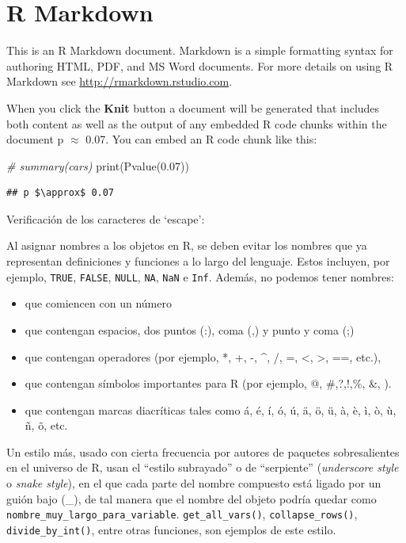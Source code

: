 \documentclass[
  11pt,
  twoside]{book}
\newenvironment{Shaded}{\begin{snugshade}}{\end{snugshade}}
\newcommand{\CommentTok}[1]{\textcolor[rgb]{0.56,0.35,0.01}{\textit{#1}}}
\newcommand{\FloatTok}[1]{\textcolor[rgb]{0.00,0.00,0.81}{#1}}
\newcommand{\FunctionTok}[1]{\textcolor[rgb]{0.00,0.00,0.00}{#1}}
\newcommand{\NormalTok}[1]{#1}
\providecommand{\tightlist}{%
  \setlength{\itemsep}{0pt}\setlength{\parskip}{0pt}}
\theoremstyle{definition}
\theoremstyle{definition}
\theoremstyle{definition}
\theoremstyle{definition}
\theoremstyle{remark}
\begin{document}
\hypertarget{r-markdown}{%
\section{R Markdown}\label{r-markdown}}

This is an R Markdown document. Markdown is a simple formatting syntax for authoring HTML, PDF, and MS Word documents. For more details on using R Markdown see \url{http://rmarkdown.rstudio.com}.

When you click the \textbf{Knit} button a document will be generated that includes both content as well as the output of any embedded R code chunks within the document p \(\approx\) 0.07. You can embed an R code chunk like this:

\begin{Shaded}
\begin{Highlighting}[]
\CommentTok{\# summary(cars)}
\FunctionTok{print}\NormalTok{(}\FunctionTok{Pvalue}\NormalTok{(}\FloatTok{0.07}\NormalTok{))}
\end{Highlighting}
\end{Shaded}

\begin{verbatim}
## p $\approx$ 0.07
\end{verbatim}

Verificación de los caracteres de `escape':

Al asignar nombres a los objetos en R, se deben evitar los nombres que ya representan definiciones y funciones a lo largo del lenguaje. Estos incluyen, por ejemplo, \texttt{TRUE}, \texttt{FALSE}, \texttt{NULL}, \texttt{NA}, \texttt{NaN} e \texttt{Inf}. Además, no podemos tener nombres:

\begin{itemize}
\tightlist
\item
  que comiencen con un número
\item
  que contengan espacios, dos puntos (:), coma (,) y punto y coma (;)
\item
  que contengan operadores (por ejemplo, *, +, -, \^{}, /, =, \textless, \textgreater, ==, etc.),
\item
  que contengan símbolos importantes para R (por ejemplo, @, \#,?,!,\%, \&, \textbar).
\item
  que contengan marcas diacríticas tales como á, é, í, ó, ú, ä, ö, ü, à, è, ì, ò, ù, ñ, õ, etc.
\end{itemize}

Un estilo más, usado con cierta frecuencia por autores de paquetes sobresalientes en el universo de R, usan el ``estilo subrayado'' o de ``serpiente'' (\emph{underscore style} o \emph{snake style}), en el que cada parte del nombre compuesto está ligado por un guión bajo (\_), de tal manera que el nombre del objeto podría quedar como \texttt{nombre\_muy\_largo\_para\_variable}. \texttt{get\_all\_vars()}, \texttt{collapse\_rows()}, \texttt{divide\_by\_int()}, entre otras funciones, son ejemplos de este estilo.
\end{document}
